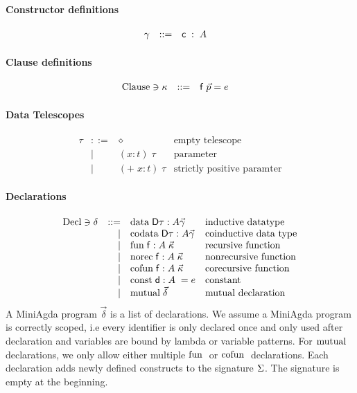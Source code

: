 \paragraph*{Constructor definitions}
\[
\begin{array}{lrll}
\gamma &  ::= & \mathsf{c} \; : \; A & 
\end{array}
\]

\paragraph*{Clause definitions}
\[
\begin{array}{lrll}
\mathrm{Clause} \ni \kappa & ::= & \mathsf{f} \; \vec{p} = e & 
\end{array}
\]

\paragraph*{Data Telescopes}
\[
\begin{array}{lrll}
\tau & ::= & \diamond & \mbox{empty telescope}\\
& \mid & ( x : t ) \; \tau & \mbox{parameter}\\
& \mid & ( + \; x : t ) \; \tau & \mbox{strictly positive paramter}
\end{array}
\]

\paragraph*{Declarations}
\[
\begin{array}{lrll}
\mathrm{Decl} \ni \delta & ::= & \mathrm{data}\; \mathsf{D} \tau : A \vec{\gamma} & \mbox{inductive datatype}\\ 
& \mid & \mathrm{codata}\; \mathsf{D} \tau : A \vec{\gamma} & \mbox{coinductive data type} \\
& \mid & \mathrm{fun}\; \mathsf{f} : A \; \vec{\kappa} & \mbox{recursive function}\\
& \mid & \mathrm{norec}\; \mathsf{f} : A \; \vec{\kappa} & \mbox{nonrecursive function}\\
& \mid & \mathrm{cofun}\; \mathsf{f} : A \; \vec{\kappa} & \mbox{corecursive function}\\ 
& \mid & \mathrm{const}\; \mathsf{d} : A \; = e & \mbox{constant}\\
& \mid & \mathrm{mutual}\; \vec{\delta} & \mbox{mutual declaration}
\end{array}
\]
A MiniAgda program $\vec{\delta}$ is a list of declarations.
We assume a MiniAgda program is correctly scoped, i.e every identifier
is only declared once and only used after declaration and variables are bound by lambda or variable patterns.
For $\mathrm{mutual}\;$ declarations, we only allow either multiple $\mathrm{fun}\;$ or $\mathrm{cofun}\;$ declarations.
Each declaration adds newly defined constructs to the signature $\mathrm{\Sigma}$.
The signature is empty at the beginning.
